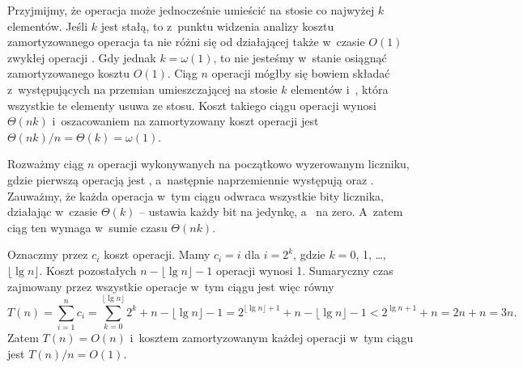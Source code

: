 
\exercise %
Przyjmijmy, że operacja  może jednocześnie umieścić na stosie co najwyżej $k$ elementów.
Jeśli $k$ jest stałą, to z~punktu widzenia analizy kosztu zamortyzowanego operacja ta nie różni się od działającej także w~czasie $O(1)$ zwykłej operacji .
Gdy jednak $k=\omega(1)$, to nie jesteśmy w~stanie osiągnąć zamortyzowanego kosztu $O(1)$.
Ciąg $n$ operacji mógłby się bowiem składać z~występujących na przemian  umieszczającej na stosie $k$ elementów i~, która wszystkie te elementy usuwa ze stosu.
Koszt takiego ciągu operacji wynosi $\Theta(nk)$ i~oszacowaniem na zamortyzowany koszt operacji jest $\Theta(nk)/n=\Theta(k)=\omega(1)$.

\exercise %
Rozważmy ciąg $n$ operacji wykonywanych na początkowo wyzerowanym liczniku, gdzie pierwszą operacją jest , a~następnie naprzemiennie występują  oraz .
Zauważmy, że każda operacja w~tym ciągu odwraca wszystkie bity licznika, działając w~czasie $\Theta(k)$ --  ustawia każdy bit na jedynkę, a~ na zero.
A~zatem ciąg ten wymaga w~sumie czasu $\Theta(nk)$.

\exercise %
Oznaczmy przez $c_i$ koszt  operacji.
Mamy $c_i=i$ dla $i=2^k$, gdzie $k=0$, 1, \dots, $\lfloor\lg n\rfloor$.
Koszt pozostałych $n-\lfloor\lg n\rfloor-1$ operacji wynosi 1.
Sumaryczny czas zajmowany przez wszystkie operacje w~tym ciągu jest więc równy
\[
	T(n) = \sum_{i=1}^nc_i = \sum_{k=0}^{\lfloor\lg n\rfloor}2^k+n-\lfloor\lg n\rfloor-1 = 2^{\lfloor\lg n\rfloor+1}+n-\lfloor\lg n\rfloor-1 < 2^{\lg n+1}+n = 2n+n = 3n.
\]
Zatem $T(n)=O(n)$ i~kosztem zamortyzowanym każdej operacji w~tym ciągu jest $T(n)/n=O(1)$.
